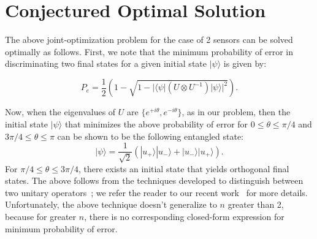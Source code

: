 \section{Conjectured Optimal \iso Solution}
\label{sec:optimal}


The above joint-optimization problem for the case of 2 sensors can be solved optimally as follows. 
First, we note that the minimum probability of error in discriminating two final states for a given initial state $|\psi\rangle$  is given by: 

\begin{equation}
P_{e} = \frac{1}{2} \left( 1 - \sqrt{ 1 - |\langle \psi |(U\otimes U^{-1} ) |\psi\rangle |^{2}} \right). 
\label{eqn:two}
\end{equation}

Now, when the eigenvalues of 
$U$ are $\{e^{+i\theta}, e^{-i\theta}\}$, as in our \iso problem, then
the initial state $|\psi\rangle$ that minimizes the above
probability of error for $0 \leq \theta \leq \pi /4$ and 
$3\pi/4 \leq \theta \leq \pi$
can be shown to be the following entangled state:
 \begin{equation}
 |\psi\rangle= \frac{1}{\sqrt{2}} (|u_{+}\rangle |u_{-}\rangle + |u_{-}\rangle |u_{+}\rangle ).
 \label{eqn:two-sol}
 \end{equation}
For 
$\pi /4 \leq \theta \leq 3\pi/4$, there exists an initial state that
yields orthogonal final states. 
The above follows from the techniques developed to 
distinguish between two unitary operators~\cite{DAriano_2002};
we refer the reader to our recent work~\cite{Hillery_2023} for
more details. Unfortunately, the 
above technique doesn't generalize to $n$ greater than 2, because
for greater $n$, there is no corresponding closed-form expression for minimum
probability of error.

